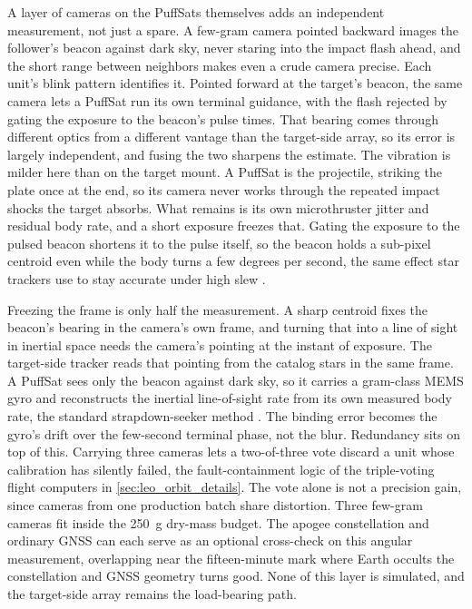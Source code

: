 \documentclass{article}
\begin{document}
A layer of cameras on the PuffSats themselves adds an independent measurement, not just a spare. A few-gram camera pointed backward images the follower's beacon against dark sky, never staring into the impact flash ahead, and the short range between neighbors makes even a crude camera precise. Each unit's blink pattern identifies it. Pointed forward at the target's beacon, the same camera lets a PuffSat run its own terminal guidance, with the flash rejected by gating the exposure to the beacon's pulse times. That bearing comes through different optics from a different vantage than the target-side array, so its error is largely independent, and fusing the two sharpens the estimate. The vibration is milder here than on the target mount. A PuffSat is the projectile, striking the plate once at the end, so its camera never works through the repeated impact shocks the target absorbs. What remains is its own microthruster jitter and residual body rate, and a short exposure freezes that. Gating the exposure to the pulsed beacon shortens it to the pulse itself, so the beacon holds a sub-pixel centroid even while the body turns a few degrees per second, the same effect star trackers use to stay accurate under high slew \cite{wei2014exposure}.

Freezing the frame is only half the measurement. A sharp centroid fixes the beacon's bearing in the camera's own frame, and turning that into a line of sight in inertial space needs the camera's pointing at the instant of exposure. The target-side tracker reads that pointing from the catalog stars in the same frame. A PuffSat sees only the beacon against dark sky, so it carries a gram-class MEMS gyro and reconstructs the inertial line-of-sight rate from its own measured body rate, the standard strapdown-seeker method \cite{sun2015los}. The binding error becomes the gyro's drift over the few-second terminal phase, not the blur. Redundancy sits on top of this. Carrying three cameras lets a two-of-three vote discard a unit whose calibration has silently failed, the fault-containment logic of the triple-voting flight computers in \autoref{sec:leo_orbit_details}. The vote alone is not a precision gain, since cameras from one production batch share distortion. Three few-gram cameras fit inside the \SI{250}{\gram} dry-mass budget. The apogee constellation and ordinary GNSS can each serve as an optional cross-check on this angular measurement, overlapping near the fifteen-minute mark where Earth occults the constellation and GNSS geometry turns good. None of this layer is simulated, and the target-side array remains the load-bearing path.
\end{document}
